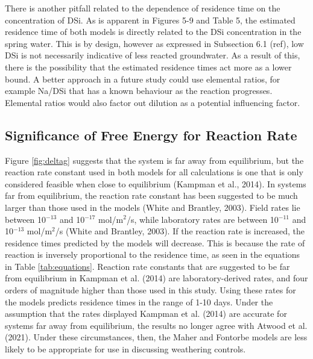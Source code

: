 \FloatBarrier

There is another pitfall related to the dependence of residence time on the concentration of DSi. As is apparent in Figures 5-9 and Table 5, the estimated residence time of both models is directly related to the DSi concentration in the spring water. This is by design, however as expressed in Subsection 6.1 (ref), low DSi is not necessarily indicative of less reacted groundwater. As a result of this, there is the possibility that the estimated residence times act more as a lower bound. A better approach in a future study could use elemental ratios, for example Na/DSi that has a known behaviour as the reaction progresses. Elemental ratios would also factor out dilution as a potential influencing factor.


\newpage


\subsection{Significance of Free Energy for Reaction Rate}

Figure \ref{fig:deltag} suggests that the system is far away from equilibrium, but the reaction rate constant used in both models for all calculations is one that is only considered feasible when close to equilibrium (Kampman et al., 2014). In systems far from equilibrium, the reaction rate constant has been suggested to be much larger than those used in the models (White and Brantley, 2003). Field rates lie between 10$^{-13}$ and 10$^{-17}$ mol/m$^2$/s, while laboratory rates are between 10$^{-11}$ and 10$^{-13}$ mol/m$^2$/s (White and Brantley, 2003). If the reaction rate is increased, the residence times predicted by the models will decrease. This is because the rate of reaction is inversely proportional to the residence time, as seen in the equations in Table \ref{tab:equations}. Reaction rate constants that are suggested to be far from equilibrium in Kampman et al. (2014) are laboratory-derived rates, and four orders of magnitude higher than those used in this study. Using these rates for the models predicts residence times in the range of 1-10 days. Under the assumption that the rates displayed Kampman et al. (2014) are accurate for systems far away from equilibrium, the results no longer agree with Atwood et al. (2021). Under these circumstances, then, the Maher and Fontorbe models are less likely to be appropriate for use in discussing weathering controls. 

\bsk


